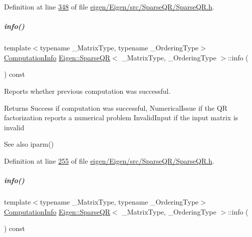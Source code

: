 Definition at line \hyperlink{eigen_2_eigen_2src_2_sparse_q_r_2_sparse_q_r_8h_source_l00348}{348} of file \hyperlink{eigen_2_eigen_2src_2_sparse_q_r_2_sparse_q_r_8h_source}{eigen/\+Eigen/src/\+Sparse\+Q\+R/\+Sparse\+Q\+R.\+h}.

\mbox{\label{group___sparse_q_r___module_a234b0580aaf57237393f2e73a3d38690}} 
\subparagraph{\texorpdfstring{info()}{info()}\hspace{0.1cm}{\footnotesize\ttfamily [1/2]}}
{\footnotesize\ttfamily template$<$typename \+\_\+\+Matrix\+Type, typename \+\_\+\+Ordering\+Type$>$ \\
\hyperlink{group__enums_ga85fad7b87587764e5cf6b513a9e0ee5e}{Computation\+Info} \hyperlink{group___sparse_q_r___module_class_eigen_1_1_sparse_q_r}{Eigen\+::\+Sparse\+QR}$<$ \+\_\+\+Matrix\+Type, \+\_\+\+Ordering\+Type $>$\+::info (\begin{DoxyParamCaption}{ }\end{DoxyParamCaption}) const\hspace{0.3cm}{\ttfamily [inline]}}



Reports whether previous computation was successful. 

\begin{DoxyReturn}{Returns}
{\ttfamily Success} if computation was successful, {\ttfamily Numerical\+Issue} if the QR factorization reports a numerical problem {\ttfamily Invalid\+Input} if the input matrix is invalid
\end{DoxyReturn}
\begin{DoxySeeAlso}{See also}
iparm() 
\end{DoxySeeAlso}


Definition at line \hyperlink{eigen_2_eigen_2src_2_sparse_q_r_2_sparse_q_r_8h_source_l00255}{255} of file \hyperlink{eigen_2_eigen_2src_2_sparse_q_r_2_sparse_q_r_8h_source}{eigen/\+Eigen/src/\+Sparse\+Q\+R/\+Sparse\+Q\+R.\+h}.

\mbox{\label{group___sparse_q_r___module_a234b0580aaf57237393f2e73a3d38690}} 
\subparagraph{\texorpdfstring{info()}{info()}\hspace{0.1cm}{\footnotesize\ttfamily [2/2]}}
{\footnotesize\ttfamily template$<$typename \+\_\+\+Matrix\+Type, typename \+\_\+\+Ordering\+Type$>$ \\
\hyperlink{group__enums_ga85fad7b87587764e5cf6b513a9e0ee5e}{Computation\+Info} \hyperlink{group___sparse_q_r___module_class_eigen_1_1_sparse_q_r}{Eigen\+::\+Sparse\+QR}$<$ \+\_\+\+Matrix\+Type, \+\_\+\+Ordering\+Type $>$\+::info (\begin{DoxyParamCaption}{ }\end{DoxyParamCaption}) const\hspace{0.3cm}{\ttfamily [inline]}}



